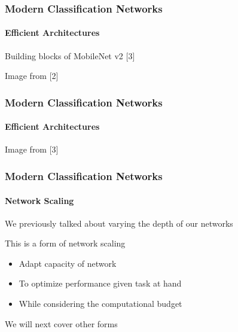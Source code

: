 \documentclass[xetex,professionalfont]{beamer}
\renewcommand\emph[1]{\textcolor{tuwcvl_cvl_blue}{#1}}
\begin{document}
\begin{frame}
	\frametitle{Modern Classification Networks}
	\framesubtitle{Efficient Architectures}

	Building blocks of MobileNet v2 [3]

	\medskip

	\begin{center}
		{\centering Image from [2]}
	\end{center}

\end{frame}


\begin{frame}
	\frametitle{Modern Classification Networks}
	\framesubtitle{Efficient Architectures}


	\begin{center}
		{\centering Image from [3]}
	\end{center}

\end{frame}


\begin{frame}
	\frametitle{Modern Classification Networks}
	\framesubtitle{Network Scaling}

	We previously talked about varying the depth of our networks

	\bigskip
	This is a form of \emph{network scaling}
	\begin{itemize}
		\item Adapt capacity of network
		\item To optimize performance given task at hand
		\item While considering the computational budget
	\end{itemize}

	\bigskip
	We will next cover other forms

\end{frame}
\end{document}
